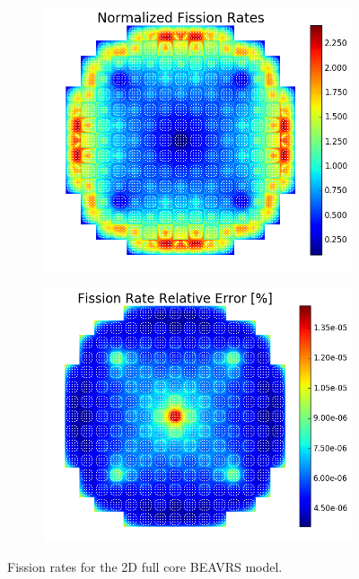 \begin{figure}[h!]
\centering
\begin{subfigure}{0.44\textwidth}
  \centering
  \includegraphics[width=\linewidth]{figures/benchmarks/fission-rates/fiss-mean-full-core}
  \caption{}
  \label{fig:chap7-fiss-rate-mean-full-core}
\end{subfigure}%
\begin{subfigure}{0.44\textwidth}
  \centering
  \includegraphics[width=\linewidth]{figures/benchmarks/fission-rates/fiss-rel-err-full-core}
  \caption{}
  \label{fig:chap7-fiss-rate-rel-err-full-core}
\end{subfigure}%
\caption[Fission rates for the full 2D BEAVRS core]{Fission rates for the 2D full core \ac{BEAVRS} model.}
\label{fig:chap7-fiss-rates-full-core}
\end{figure}

